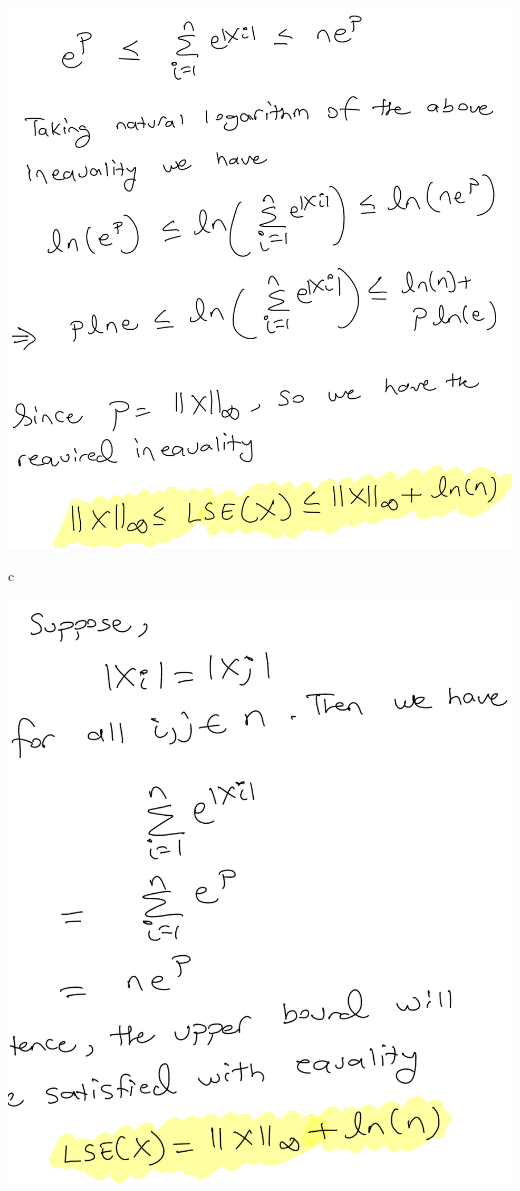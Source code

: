 \documentclass{article}
\renewcommand{\bf}[1]{\textbf{{#1}}}
\newcommand{\ul}[1]{\underline{{#1}}}
\newcommand{\tbu}{\bf{\ul{}}}
\begin{document}
\begin{minipage}{2.6in}
\includegraphics[scale=0.22]{mr6a2.png}

\tbu{c}

\includegraphics[scale=0.22]{mr6c.png}


\end{minipage}
\end{document}
